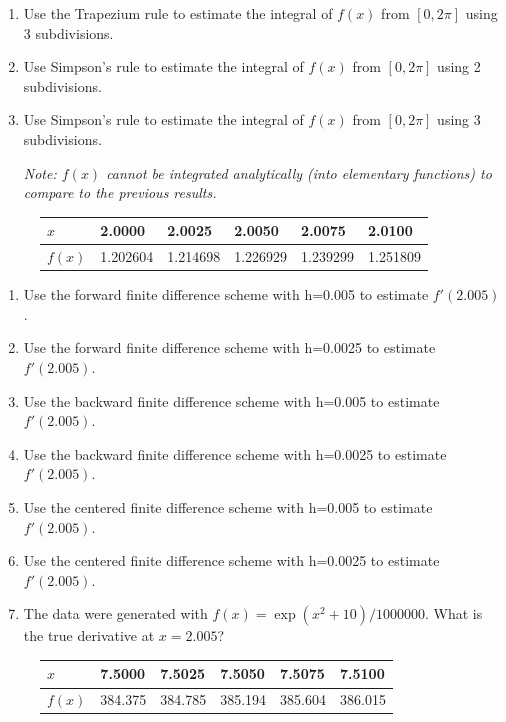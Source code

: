 {\begin{enumerate}[label=\alph*)]
	\item Use the Trapezium rule to estimate the integral of $f(x)$ from $[0,2\pi]$ using 3 subdivisions.
	
	\item Use Simpson's rule to estimate the integral of $f(x)$ from $[0,2\pi]$ using 2 subdivisions.
	
	\item Use Simpson's rule to estimate the integral of $f(x)$ from $[0,2\pi]$ using 3 subdivisions.
	
	\textit{Note: $f(x)$ cannot be integrated analytically (into elementary functions) to compare to the previous results.}
\end{enumerate}


\begin{figure}[h]
\begin{tabular}{l|lllll}
$x$    & 2.0000   & 2.0025   & 2.0050   & 2.0075   & 2.0100 \\  \hline
$f(x)$ & 1.202604 & 1.214698 & 1.226929 & 1.239299 & 1.251809
\end{tabular}
\end{figure}

\begin{enumerate}[label=\alph*)]
	\item Use the forward finite difference scheme with h=0.005 to estimate $f'(2.005)$.
	
	\item Use the forward finite difference scheme with h=0.0025 to estimate $f'(2.005)$.

	\item Use the backward finite difference scheme with h=0.005 to estimate $f'(2.005)$.

	\item Use the backward finite difference scheme with h=0.0025 to estimate $f'(2.005)$.
	
	\item Use the centered finite difference scheme with h=0.005 to estimate $f'(2.005)$.

	\item Use the centered finite difference scheme with h=0.0025 to estimate $f'(2.005)$.

	\item The data were generated with $f(x)=\exp(x^2 + 10)/1000000$. What is the true derivative at $x=2.005$?
\end{enumerate}


\begin{figure}[h]
\begin{tabular}{l|lllll}
$x$    & 7.5000   & 7.5025   & 7.5050   & 7.5075   & 7.5100 \\  \hline
$f(x)$ & 384.375 & 384.785 & 385.194 & 385.604 & 386.015
\end{tabular}
\end{figure}          

}
